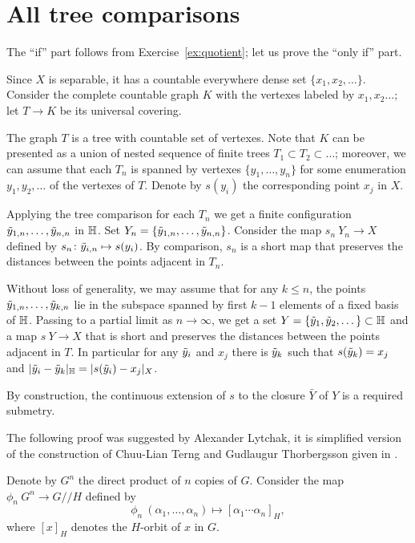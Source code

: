 \section{All tree comparisons}\label{sec:all-tree}


The ``if'' part follows from Exercise~\ref{ex:quotient};
let us prove the ``only if'' part.

Since $X$ is separable, it has a countable everywhere dense set $\{x_1,x_2,\dots\}$.
Consider the complete countable graph $K$ with the vertexes labeled by $x_1,x_2\dots$;
let $T\to K$ be its universal covering.

The graph $T$ is a tree with countable set of vertexes.
Note that $K$ can be presented as a union of nested sequence of finite trees $T_1\subset T_2\subset \dots$;
moreover, we can assume that each $T_n$ is spanned by vertexes $\{y_1,\dots,y_n\}$ for some enumeration $y_1,y_2,\dots$ of the vertexes of $T$.
Denote by $s(y_i)$ the corresponding point $x_j$ in $X$.

Applying the tree comparison for each $T_n$ we get a finite configuration $\~y_{1,n},\dots,\~y_{n,n}$ in $\HH$.
Set $Y_n=\{\~y_{1,n},\dots,\~y_{n,n}\}$. 
Consider the map $s_n\:Y_n\to X$ defined by $s_n\:\~y_{i,n}\mapsto s(y_i)$.
By comparison, $s_n$ is a short map that preserves the distances between the points adjacent in $T_n$.

Without loss of generality, we may assume that for any $k\le n$, the points $\~y_{1,n},\dots,\~y_{k,n}$ lie in the subspace spanned by first $k-1$ elements of a fixed basis of $\HH$.
Passing to a partial limit as $n\to \infty$, we get a set $Y=\{\~y_1,\~y_2,\dots\}\subset \HH$ and a map $s\:Y\to X$ that is short and preserves the distances between the points adjacent in $T$.
In particular for any $\~y_i$ and $x_j$ there is $\~y_k$ such that $s(\~y_k)=x_j$ and $|\~y_i-\~y_k|_\HH=|s(\~y_i)-x_j|_X$.

By construction, the continuous extension of $s$ to the closure $\bar Y$ of $Y$ is a required submetry.
\qeds

The following proof was suggested by Alexander Lytchak, it is simplified version of the construction of Chuu-Lian Terng and Gudlaugur Thorbergsson given in \cite[Section 4]{terng-thorbergsson}.


Denote by $G^n$ the direct product of $n$ copies of $G$.
Consider the map $\phi_n\:G^n\to G/\!\!/H$ defined by
\[\phi_n\:(\alpha_1,\dots,\alpha_n)\mapsto [\alpha_1\cdots\alpha_n]_H,\]
where $[x]_H$ denotes the $H$-orbit of $x$ in $G$.

